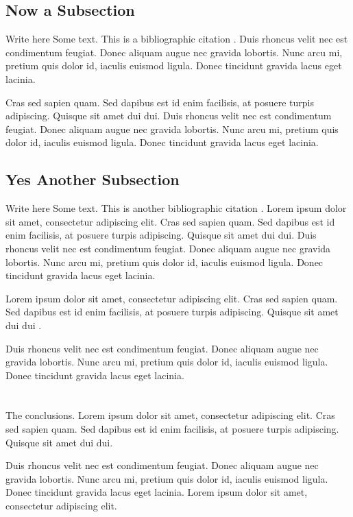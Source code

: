\documentclass[a4paper,12pt,journal,twoside,compsoc]{PPIEEEtran}
\begin{document}
\subsection{Now a Subsection}
Write here Some text. This is a bibliographic citation \cite{RFC_INTSERV}.
Duis rhoncus velit nec est condimentum feugiat. Donec aliquam augue nec gravida lobortis. Nunc arcu mi, pretium quis dolor id, iaculis euismod ligula. Donec tincidunt gravida lacus eget lacinia.

Cras sed sapien quam. Sed dapibus est id enim facilisis, at posuere turpis adipiscing. Quisque sit amet dui dui.
Duis rhoncus velit nec est condimentum feugiat. Donec aliquam augue nec gravida lobortis. Nunc arcu mi, pretium quis dolor id, iaculis euismod ligula. Donec tincidunt gravida lacus eget lacinia. 
\subsection{Yes Another Subsection}
Write here Some text. This is another bibliographic citation \cite{lamport:latex}. Lorem ipsum dolor sit amet, consectetur adipiscing elit. Cras sed sapien quam. Sed dapibus est id enim facilisis, at posuere turpis adipiscing. Quisque sit amet dui dui.
Duis rhoncus velit nec est condimentum feugiat. Donec aliquam augue nec gravida lobortis. Nunc arcu mi, pretium quis dolor id, iaculis euismod ligula. Donec tincidunt gravida lacus eget lacinia. 

Lorem ipsum dolor sit amet, consectetur adipiscing elit. Cras sed sapien quam. Sed dapibus est id enim facilisis, at posuere turpis adipiscing. Quisque sit amet dui dui \cite{lamport:latex}.

Duis rhoncus velit nec est condimentum feugiat. Donec aliquam augue nec gravida lobortis. Nunc arcu mi, pretium quis dolor id, iaculis euismod ligula. Donec tincidunt gravida lacus eget lacinia.
\section{}
The conclusions. Lorem ipsum dolor sit amet, consectetur adipiscing elit. Cras sed sapien quam. Sed dapibus est id enim facilisis, at posuere turpis adipiscing. Quisque sit amet dui dui.

Duis rhoncus velit nec est condimentum feugiat. Donec aliquam augue nec gravida lobortis. Nunc arcu mi, pretium quis dolor id, iaculis euismod ligula. Donec tincidunt gravida lacus eget lacinia. Lorem ipsum dolor sit amet, consectetur adipiscing elit.
\ifCLASSOPTIONcompsoc
\end{document}
